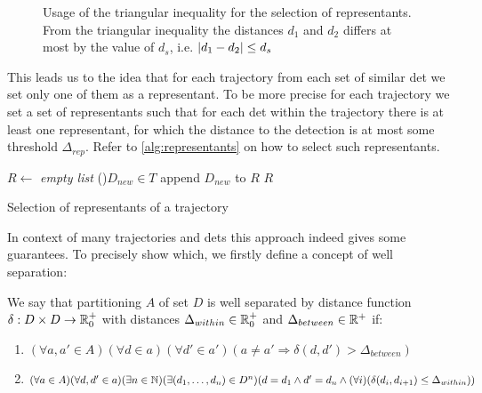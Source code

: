 \begin{figure}
    \centering
    \def\svgwidth{\columnwidth}
    \scalebox{0.6}{}
    \caption[Usage of triangular inequality for the selection of representants]{Usage of the triangular inequality for the selection of representants. From the triangular inequality the distances $d_1$ and $d_2$ differs at most by the value of $d_s$, i.e. $\left|{d_1 - d_2}\right| \leq d_s$}
    \label{fig:triangular}
\end{figure}

This leads us to the idea that for each trajectory from each set of similar \gls{det} we set only one of them as a representant. To be more precise for each trajectory we set a set of representants such that for each \gls{det} within the trajectory there is at least one representant, for which the distance to the detection is at most some threshold $\Delta_{rep}$. Refer to \autoref{alg:representants} on how to select such representants.

\begin{algorithm}

 
 \BlankLine
 $R \leftarrow$ \emph{empty list}\;
 \For(){$D_{new} \in T$}{
  append $D_{new}$ to $R$\;
 }
 \Return $R$
 \caption{Selection of representants of a trajectory}
 \label{alg:representants}
\end{algorithm}

In context of many trajectories and \glspl{det} this approach indeed gives some guarantees. To precisely show which, we firstly define a concept of well separation:

\begin{defn}
\label{defn:well_sep}
We say that partitioning $A$ of set $D$ is well separated by distance function $\delta: D \times D \rightarrow \mathbb{R}_0^+$ with distances $\Delta_{within} \in \mathbb{R}_0^+$ and $\Delta_{between} \in \mathbb{R}^+$ if:
\begin{enumerate}[label=(\roman*)]
    \item $(\forall a, a' \in A) (\forall d \in a) (\forall d' \in a') (a \neq a' \Rightarrow \delta(d, d') > \Delta_{between})$ \label{item:between}
    \item $(\forall a \in A)(\forall d, d' \in a) (\exists n \in \mathbb{N}) (\exists (d_1, \ldots, d_n) \in D^n) (d = d_1 \land d' = d_n \land (\forall i) (\delta(d_i, d_{i+1}) \leq \Delta_{within}))$ \label{item:within}
\end{enumerate}
\end{defn}

